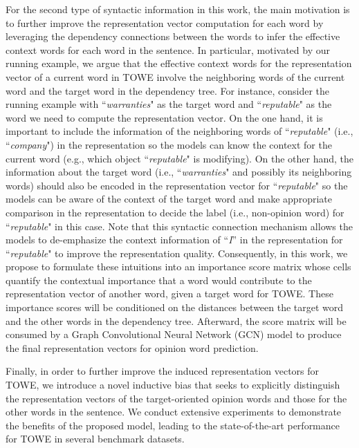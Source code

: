 \documentclass[11pt,a4paper]{article}
\begin{document}
For the second type of syntactic information in this work, the main motivation is to further improve the representation vector computation for each word by leveraging the dependency connections between the words to infer the effective context words for each word in the sentence. In particular, motivated by our running example, we argue that the effective context words for the representation vector of a current word in TOWE involve the neighboring words of the current word and the target word in the dependency tree. For instance, consider the running example with ``\textit{warranties}" as the target word and ``\textit{reputable}" as the word we need to compute the representation vector. On the one hand, it is important to include the information of the neighboring words of ``\textit{reputable}" (i.e., ``\textit{company}") in the representation so the models can know the context for the current word (e.g., which object ``\textit{reputable}" is modifying). On the other hand, the information about the target word (i.e., ``\textit{warranties}" and possibly its neighboring words) should also be encoded in the representation vector for ``\textit{reputable}" so the models can be aware of the context of the target word and make appropriate comparison in the representation to decide the label (i.e., non-opinion word) for ``\textit{reputable}" in this case. Note that this syntactic connection mechanism allows the models to de-emphasize the context information of ``\textit{I}'' in the representation for ``\textit{reputable}" to improve the representation quality. Consequently, in this work, we propose to formulate these intuitions into an importance score matrix whose cells quantify the contextual importance that a word would contribute to the representation vector of another word, given a target word for TOWE. These importance scores will be conditioned on the distances between the target word and the other words in the dependency tree. Afterward, the score matrix will be consumed by a Graph Convolutional Neural Network (GCN) model \citep{kipf2017semi} to produce the final representation vectors for opinion word prediction.

Finally, in order to further improve the induced representation vectors for TOWE, we introduce a novel inductive bias that seeks to explicitly distinguish the representation vectors of the target-oriented opinion words and those for the other words in the sentence. We conduct extensive experiments to demonstrate the benefits of the proposed model, leading to the state-of-the-art performance for TOWE in several benchmark datasets.
\end{document}
